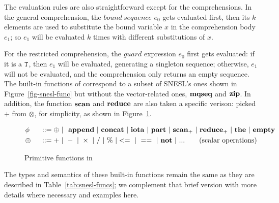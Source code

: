 The evaluation rules are also straightforward except for the comprehensions.
In the general comprehension, the $bound \ sequence$ $e_0$ gets evaluated first, then its $k$ elements are used to substitute the bound variable $x$ in the comprehension body $e_1$; so $e_1$ will be evaluated $k$ times with different substitutions of $x$.

For the restricted comprehension, the $guard$ expression $e_0$ first gets evaluated: if it is a $\mathtt{T}$, then $e_1$ will be evaluated, generating a singleton sequence; otherwise, $e_1$ will not be evaluated, and the comprehension only returns an empty sequence. \\


The built-in functions of \mysnesl correspond to a subset of SNESL's ones shown in Figure~\ref{fig-snesl-func} but without the vector-related ones, $\mathbf{mqseq}$ and $\mathbf{zip}$. 
In addition, the function $\mathbf{scan}$ and $\mathbf{reduce}$ are also
taken a specific verison: picked $+$ from $\otimes$, for simplicity, as shown in Figure~\ref{fig-mysnesl-func}. 


\begin{figure}[H]\large
	\begin{alignat*}{2} 
	&\phi && ::= \oplus \ | \  \ \mathbf{append} \ | \ \mathbf{concat}  \ | \ \mathbf{iota}  \ | \ \mathbf{part}  \ | \ \mathbf{scan}_+ \ | \ \mathbf{reduce}_{+} \ | \ \mathbf{the}  \ | \ \mathbf{empty} \\	
	& \oplus  \ && :: = + \ | \ - \ | \ \times \ |  \  / \ | \ \% \ | <= \ | \ == \ | \  \mathbf{not} \ | \ ... \tag{scalar operations} 
	\end{alignat*}
	\caption{Primitive functions in \mysnesl \label{fig-mysnesl-func}}
\end{figure}

The types and semantics of these built-in functions remain the same as they are described in Table~\ref{tab:snesl-funcs}; we complement that brief version with more details where necessary and examples here.

